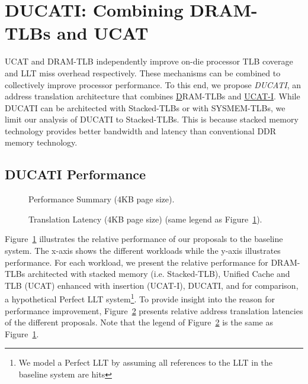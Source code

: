 \section{DUCATI: Combining DRAM-TLBs \newline and UCAT}
\label{sec:DUCATI}

\noindent UCAT and DRAM-TLB independently improve on-die processor TLB
coverage and LLT miss overhead respectively. These mechanisms can be
combined to collectively improve processor performance. To this end,
we propose {\em DUCATI}, an address translation architecture that
combines \underline{D}RAM-TLBs and \underline{UCAT-I}. While DUCATI
can be architected with Stacked-TLBs or with SYSMEM-TLBs, we limit our
analysis of DUCATI to Stacked-TLBs. This is because stacked memory
technology provides better bandwidth and latency than
conventional DDR memory technology.

\subsection{DUCATI Performance}

\begin{figure}[tp] 
\vspace{-0 in} \centering
\centerline{}

\caption{\small Performance Summary (4KB page size).\normalsize}
\label{fig:summary_4k_pages_perf} 
\vspace{0.1 in}
\end{figure}

\begin{figure}[tp] 
\vspace{0.1 in} \centering
\centerline{}

\caption{\small Translation Latency (4KB page size) (same legend as
  Figure~\ref{fig:summary_4k_pages_perf}).\normalsize}
\label{fig:summary_4k_pages_lat} 
\vspace{-0. in}
\end{figure}

\noindent Figure~\ref{fig:summary_4k_pages_perf} illustrates the
relative performance of our proposals to the baseline system. The
x-axis shows the different workloads while the y-axis illustrates
performance. For each workload, we present the relative performance
for DRAM-TLBs architected with stacked memory (i.e. Stacked-TLB),
Unified Cache and TLB (UCAT) enhanced with insertion (UCAT-I), DUCATI,
and for comparison, a hypothetical Perfect LLT system\footnote{We
model a Perfect LLT by assuming all references to the LLT in the
baseline system are hits}. To provide insight into the reason for
performance improvement, Figure~\ref{fig:summary_4k_pages_lat}
presents relative address translation latencies of the different
proposals. Note that the legend of
Figure~\ref{fig:summary_4k_pages_lat} is the same as
Figure~\ref{fig:summary_4k_pages_perf}.

